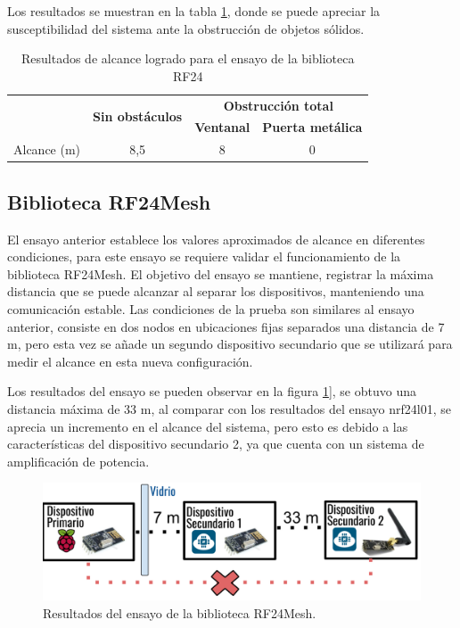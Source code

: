 Los resultados se muestran en la tabla \ref{tab:tabla_1}, donde se puede apreciar la susceptibilidad del sistema ante la obstrucción de objetos sólidos.

\begin{table}[h]
\centering
\caption[Resultados ensayo biblioteca RF24]{Resultados de alcance logrado para el ensayo de la biblioteca RF24}
\begin{tabular}{lccc}
\toprule
\textbf{}                       & \multirow{2}{*}{\textbf{Sin obstáculos}} & \multicolumn{2}{c}{\textbf{Obstrucción total}} \\
\textbf{}                       &                                          & \textbf{Ventanal}  & \textbf{Puerta metálica}  \\
\midrule
\multicolumn{1}{c}{Alcance (m)} & 8,5                                      & 8                  & 0                        
\\
\bottomrule
\hline                                                                        
\end{tabular}
\label{tab:tabla_1}
\end{table}


\subsection{Biblioteca RF24Mesh}

El ensayo anterior establece los valores aproximados de alcance en diferentes condiciones, para este ensayo se requiere validar el funcionamiento de la biblioteca RF24Mesh. 
El objetivo del ensayo se mantiene, registrar la máxima distancia que se puede alcanzar al separar los dispositivos, manteniendo una comunicación estable. Las condiciones de la prueba son similares al ensayo anterior, consiste en dos nodos en ubicaciones fijas separados una distancia de 7 m, pero esta vez se añade un segundo dispositivo secundario que se utilizará para medir el alcance en esta nueva configuración.


Los resultados del ensayo se pueden observar en la figura \ref{fig:figura_d}], se obtuvo una distancia máxima de 33 m, al comparar con los resultados del ensayo nrf24l01, se aprecia un incremento en el alcance del sistema, pero esto es debido a las características del dispositivo secundario 2, ya que cuenta con un sistema de amplificación de potencia.

\begin{figure}[ht]
	\centering
	\includegraphics[scale=.3]{./Figures/Capitulo4/Figura_D.png}
	\caption{Resultados del ensayo de la biblioteca RF24Mesh.}
	\label{fig:figura_d}
\end{figure}

